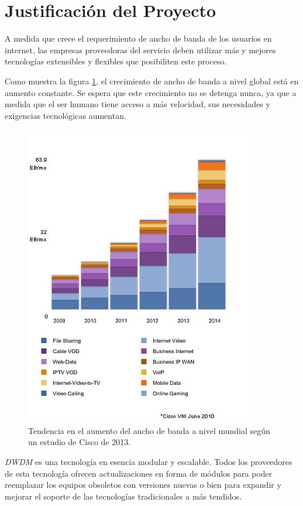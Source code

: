 \section{Justificaci\'on del Proyecto}\label{sec:justificacion}

A medida que crece el requerimiento de ancho de banda de los usuarios
en internet, las empresas proveedoras del servicio deben utilizar más
y mejores tecnologías extensibles y flexibles que posibiliten este
proceso.

Como muestra la figura \ref{fig:aumento_bw}, el crecimiento de ancho
de banda a nivel global está en aumento constante. Se espera que este
crecimiento no se detenga nunca, ya que a medida que el ser humano
tiene acceso a más velocidad, sus necesidades y exigencias tecnológicas
aumentan.

\begin{figure}[H]
  \centering
  \includegraphics[width=10cm]{Imagenes/aumento_bw.png}
  \caption{Tendencia en el aumento del ancho de banda a nivel mundial
    según un estudio de Cisco de 2013.}
  \label{fig:aumento_bw}
\end{figure}

\emph{DWDM} es una tecnología en esencia modular y escalable. Todos
los proveedores de esta tecnología ofrecen actualizaciones en forma de
módulos para poder reemplazar los equipos obsoletos con versiones
nuevas o bien para expandir y mejorar el soporte de las tecnologías
tradicionales a más tendidos.

